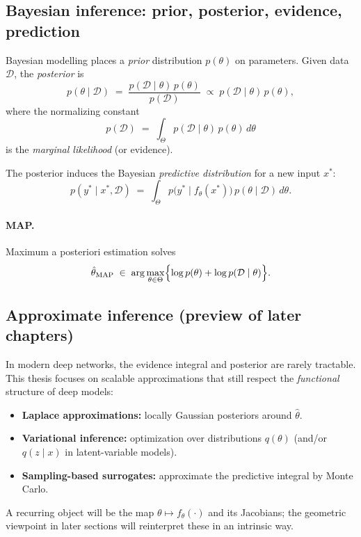 \subsection{Bayesian inference: prior, posterior, evidence, prediction}
Bayesian modelling places a \emph{prior} distribution $p(\theta)$ on parameters.
Given data $\mathcal{D}$, the \emph{posterior} is
\begin{equation}
  p(\theta \mid \mathcal{D})
  \;=\;
  \frac{p(\mathcal{D}\mid \theta)\,p(\theta)}{p(\mathcal{D})}
  \;\propto\;
  p(\mathcal{D}\mid \theta)\,p(\theta),
\end{equation}
where the normalizing constant
\begin{equation}
  p(\mathcal{D})
  \;=\;
  \int_{\Theta} p(\mathcal{D}\mid \theta)\,p(\theta)\,d\theta
\end{equation}
is the \emph{marginal likelihood} (or evidence).

The posterior induces the Bayesian \emph{predictive distribution} for a new input $x^\ast$:
\begin{equation}
  p(y^\ast \mid x^\ast, \mathcal{D})
  \;=\;
  \int_{\Theta} p\!\bigl(y^\ast \mid f_\theta(x^\ast)\bigr)\,p(\theta\mid \mathcal{D})\,d\theta.
\end{equation}

\paragraph{MAP.}
Maximum a posteriori estimation solves
\begin{equation}
  \hat\theta_{\mathrm{MAP}}
  \;\in\;
  \arg\max_{\theta\in\Theta} \Bigl\{\log p(\theta) + \log p(\mathcal{D}\mid \theta)\Bigr\}.
\end{equation}

\subsection{Approximate inference (preview of later chapters)}
In modern deep networks, the evidence integral and posterior are rarely tractable.
This thesis focuses on scalable approximations that still respect the \emph{functional} structure of deep models:
\begin{itemize}[leftmargin=1.4em,itemsep=0.25em]
  \item \textbf{Laplace approximations:} locally Gaussian posteriors around $\hat\theta$.
  \item \textbf{Variational inference:} optimization over distributions $q(\theta)$ (and/or $q(z\mid x)$ in latent-variable models).
  \item \textbf{Sampling-based surrogates:} approximate the predictive integral by Monte Carlo.
\end{itemize}
A recurring object will be the map $\theta \mapsto f_\theta(\cdot)$ and its Jacobians; the geometric viewpoint in later sections will reinterpret these in an intrinsic way.
